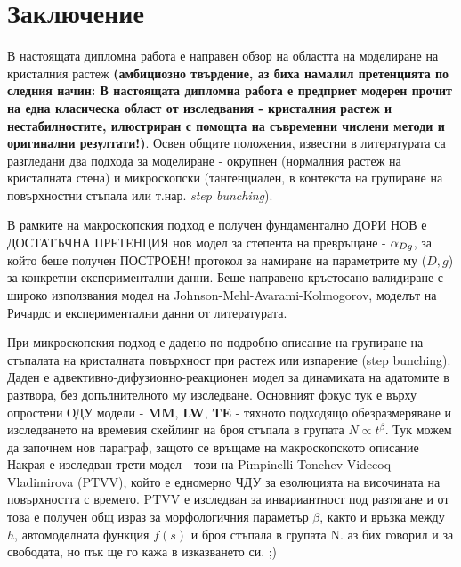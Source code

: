 \section{Заключение}
В настоящата дипломна работа е направен обзор на областта на моделиране на кристалния растеж \textbf{(амбициозно твърдение, аз биха намалил претенцията по следния начин: В настоящата дипломна работа е предприет модерен прочит на една класическа област от изследвания - кристалния растеж и нестабилностите, илюстриран с помощта на съвременни числени методи и оригинални резултати!)}. Освен общите положения, известни в литературата са разгледани два подхода за моделиране - окрупнен (нормалния растеж на кристалната стена) и микроскопски (тангенциален, в контекста на групиране на повърхностни стъпала или т.нар. \textit{step bunching}).

В рамките на макроскопския подход е получен фундаментално ДОРИ НОВ е ДОСТАТЪЧНА ПРЕТЕНЦИЯ нов модел за степента на превръщане - $\alpha_{Dg}$, за който беше получен ПОСТРОЕН! протокол за намиране на параметрите му ($D, g$) за конкретни експериментални данни. Беше направено кръстосано валидиране с широко използвания модел на Johnson-Mehl-Avarami-Kolmogorov, моделът на Ричардс и експериментални данни от литературата.

При микроскопския подход е дадено по-подробно описание на групиране на стъпалата на кристалната повърхност при растеж или изпарение (step bunching). Даден е адвективно-дифузионно-реакционен модел за динамиката на адатомите в разтвора, без допълнителното му изследване. Основният фокус тук е върху опростени ОДУ модели - \textbf{MM}, \textbf{LW}, \textbf{TE} - тяхното подходящо обезразмеряване и изследването на времевия скейлинг на броя стъпала в групата $N \propto t^\beta$. Тук можем да започнем нов параграф, защото се връщаме на макроскопското описание
Накрая е изследван трети модел - този на Pimpinelli-Tonchev-Videcoq-Vladimirova (PTVV), който е едномерно ЧДУ за еволюцията на височината на повърхността с времето. PTVV е изследван за инвариантност под разтягане и от това е получен общ израз за морфологичния параметър $\beta$, както и връзка между $h$, автомоделната функция $f(s)$ и броя стъпала в групата N. аз бих говорил и за свободата, но пък ще го кажа в изказването си. ;)
